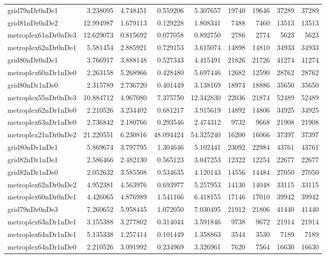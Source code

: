 \begin{longtable}{|l|r|r|r|r|r|r|r|r|}
grid79nDr0nDe1 & 3.238095 & 4.748451 & 0.559206 & 5.307657 & 19740 & 19646 & 37289 & 37289 \\
grid81nDr0nDe2 & 12.994987 & 1.679113 & 0.129228 & 1.808341 & 7488 & 7460 & 13513 & 13513 \\
metroplex61nDr0nDe3 & 12.629073 & 0.815692 & 0.077058 & 0.892750 & 2786 & 2774 & 5623 & 5623 \\
metroplex62nDr0nDe1 & 5.581454 & 2.885921 & 0.729153 & 3.615074 & 14898 & 14810 & 34933 & 34933 \\
grid80nDr0nDe1 & 3.766917 & 3.888148 & 0.527343 & 4.415491 & 21826 & 21726 & 41274 & 41274 \\
metroplex60nDr1nDe0 & 2.263158 & 5.268966 & 0.428480 & 5.697446 & 12682 & 12590 & 28762 & 28762 \\
grid80nDr1nDe0 & 2.315789 & 2.736720 & 0.401449 & 3.138169 & 18974 & 18886 & 35650 & 35650 \\
metroplex55nDr0nDe3 & 10.884712 & 4.967080 & 7.375750 & 12.342830 & 22036 & 21874 & 52489 & 52489 \\
metroplex62nDr1nDe0 & 2.210526 & 3.234402 & 0.681217 & 3.915619 & 14892 & 14806 & 34925 & 34925 \\
metroplex63nDr1nDe0 & 2.736842 & 2.180766 & 0.293546 & 2.474312 & 9732 & 9668 & 21908 & 21908 \\
metroplex21nDr0nDe2 & 21.220551 & 6.230816 & 48.094424 & 54.325240 & 16200 & 16066 & 37397 & 37397 \\
grid80nDr1nDe1 & 5.869674 & 3.797795 & 1.304646 & 5.102441 & 23092 & 22984 & 43761 & 43761 \\
grid82nDr1nDe1 & 2.586466 & 2.482130 & 0.565123 & 3.047253 & 12322 & 12254 & 22677 & 22677 \\
grid82nDr1nDe0 & 2.052632 & 3.585508 & 0.534635 & 4.120143 & 14556 & 14484 & 27050 & 27050 \\
metroplex62nDr0nDe2 & 4.952381 & 4.563976 & 0.693977 & 5.257953 & 14130 & 14048 & 33115 & 33115 \\
metroplex60nDr0nDe1 & 4.426065 & 4.876989 & 1.541166 & 6.418155 & 17146 & 17010 & 39942 & 39942 \\
grid79nDr0nDe3 & 7.260652 & 5.958445 & 1.072050 & 7.030495 & 21912 & 21806 & 41440 & 41440 \\
metroplex63nDr1nDe1 & 3.155388 & 3.277802 & 0.314044 & 3.591846 & 9738 & 9672 & 21914 & 21914 \\
metroplex64nDr1nDe1 & 5.135338 & 1.257414 & 0.101449 & 1.358863 & 3544 & 3530 & 7189 & 7189 \\
metroplex64nDr1nDe0 & 2.210526 & 3.091992 & 0.234969 & 3.326961 & 7620 & 7564 & 16630 & 16630 \\

\end{longtable}
